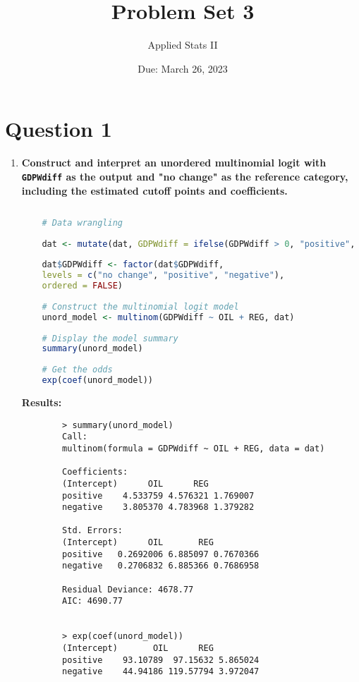 \documentclass[12pt,letterpaper]{article}
\title{Problem Set 3}
\date{Due: March 26, 2023}
\author{Applied Stats II}
\begin{document}
	\maketitle

	\vspace{.25cm}
\section*{Question 1}
\vspace{.5cm}

\begin{enumerate}
	\item \textbf{Construct and interpret an unordered multinomial logit with \texttt{GDPWdiff} as the output and "no change" as the reference category, including the estimated cutoff points and coefficients.}
	\vspace{.25cm}
	
	\begin{lstlisting}[language=R]
	
	# Data wrangling 
	
	dat <- mutate(dat, GDPWdiff = ifelse(GDPWdiff > 0, "positive", ifelse(GDPWdiff < 0, "negative", "no change")))
	
	dat$GDPWdiff <- factor(dat$GDPWdiff, 
	levels = c("no change", "positive", "negative"),
	ordered = FALSE)
	
	# Construct the multinomial logit model
	unord_model <- multinom(GDPWdiff ~ OIL + REG, dat)
	
	# Display the model summary
	summary(unord_model)
	
	# Get the odds
	exp(coef(unord_model))
	\end{lstlisting}


	\noindent \textbf{Results:}
	\begin{verbatim}
		> summary(unord_model)
		Call:
		multinom(formula = GDPWdiff ~ OIL + REG, data = dat)
		
		Coefficients:
		(Intercept)      OIL      REG
		positive    4.533759 4.576321 1.769007
		negative    3.805370 4.783968 1.379282
		
		Std. Errors:
		(Intercept)      OIL       REG
		positive   0.2692006 6.885097 0.7670366
		negative   0.2706832 6.885366 0.7686958
		
		Residual Deviance: 4678.77 
		AIC: 4690.77 
		
		
		> exp(coef(unord_model))
		(Intercept)       OIL      REG
		positive    93.10789  97.15632 5.865024
		negative    44.94186 119.57794 3.972047
		

\end{verbatim}
\end{enumerate}
\end{document}

